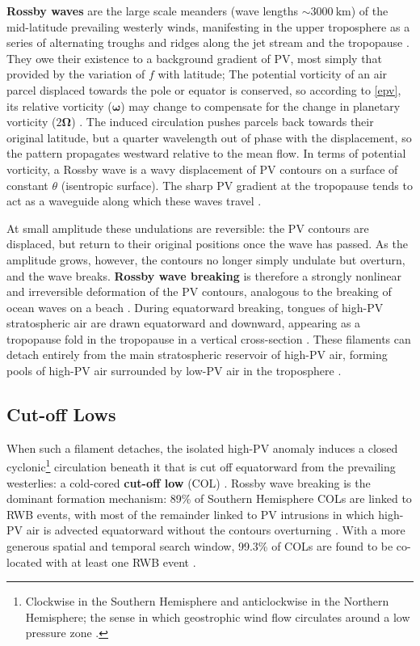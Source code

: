 \documentclass{article}
\begin{document}
\textbf{Rossby waves} are the large scale meanders (wave lengths $\sim \qty{3000}{\kilo\meter}$) of the mid-latitude prevailing westerly winds, manifesting in the upper troposphere as a series of alternating troughs and ridges \cite{Stull2015} along the jet stream and the tropopause \cite{Hoskins1985}.
They owe their existence to a background gradient of PV, most simply that provided by the variation of $f$ with latitude;
The potential vorticity of an air parcel displaced towards the pole or equator is conserved, so according to \cref{epv}, its relative vorticity ($\bm{\omega}$) may change to compensate for the change in planetary vorticity ($2 \bm{\Omega}$) \cite{Vallis2017}.
The induced circulation pushes parcels back towards their original latitude, but a quarter wavelength out of phase with the displacement, so the pattern propagates westward relative to the mean flow.
In terms of potential vorticity, a Rossby wave is a wavy displacement of PV contours on a surface of constant $\theta$ (isentropic surface).
The sharp PV gradient at the tropopause tends to act as a waveguide along which these waves travel \cite{Hoskins1985, Stull2015}.

At small amplitude these undulations are reversible: the PV contours are displaced, but return to their original positions once the wave has passed.
As the amplitude grows, however, the contours no longer simply undulate but overturn, and the wave breaks.
\textbf{Rossby wave breaking} is therefore a strongly nonlinear and irreversible deformation of the PV contours, analogous to the breaking of ocean waves on a beach \cite{Hoskins1985,Vallis2017,NdaranaWaugh2010}.
During equatorward breaking, tongues of high-PV stratospheric air are drawn equatorward and downward, appearing as a tropopause fold in the tropopause in a vertical cross-section \cite{Sprenger2007ste,Hoskins1985,Stull2015}.
These filaments can detach entirely from the main stratospheric reservoir of high-PV air, forming pools of high-PV air surrounded by low-PV air in the troposphere \cite{Sprenger2007ste}.

\subsection{Cut-off Lows}\label{sec:cols}

When such a filament detaches, the isolated high-PV anomaly induces a closed cyclonic\footnote{Clockwise in the Southern Hemisphere and anticlockwise in the Northern Hemisphere; the sense in which geostrophic wind flow circulates around a low pressure zone \cite{WMO1992}.} circulation beneath it that is cut off equatorward from the prevailing westerlies: a cold-cored \textbf{cut-off low} (COL) \cite{WMO1992}.
Rossby wave breaking is the dominant formation mechanism: 89\% of Southern Hemisphere COLs are linked to RWB events, with most of the remainder linked to PV intrusions in which high-PV air is advected equatorward without the contours overturning \cite{NdaranaWaugh2010}.
With a more generous spatial and temporal search window, 99.3\% of COLs are found to be co-located with at least one RWB event \cite{Barnes2021col}.
\end{document}
